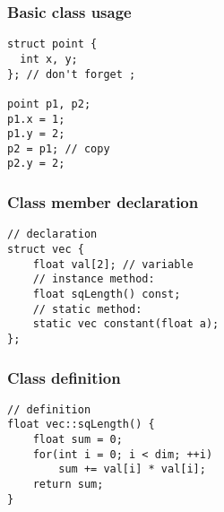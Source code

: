 
\begin{frame}
\end{frame}


\begin{frame}[fragile]
\frametitle{Basic class usage}
\begin{lstlisting}
struct point {
  int x, y;
}; // don't forget ;

point p1, p2;
p1.x = 1;
p1.y = 2;
p2 = p1; // copy
p2.y = 2;
\end{lstlisting}
\end{frame}

\begin{frame}[fragile]
\frametitle{Class member declaration}
\begin{lstlisting}
// declaration
struct vec {
    float val[2]; // variable
    // instance method:
    float sqLength() const;
    // static method:
    static vec constant(float a);
};
\end{lstlisting}
\end{frame}

\begin{frame}[fragile]
\frametitle{Class definition}
\begin{lstlisting}
// definition
float vec::sqLength() {
    float sum = 0;
    for(int i = 0; i < dim; ++i)
        sum += val[i] * val[i];
    return sum;
}
\end{lstlisting}
\end{frame}

